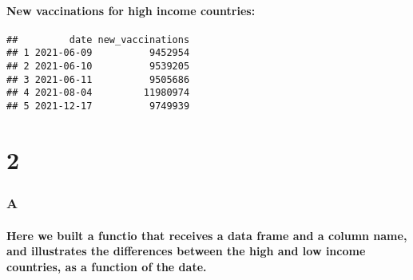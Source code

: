 \documentclass[
]{article}
\newenvironment{Shaded}{\begin{snugshade}}{\end{snugshade}}
\newcommand{\DecValTok}[1]{\textcolor[rgb]{0.00,0.00,0.81}{#1}}
\newcommand{\FunctionTok}[1]{\textcolor[rgb]{0.00,0.00,0.00}{#1}}
\newcommand{\NormalTok}[1]{#1}
\newcommand{\OtherTok}[1]{\textcolor[rgb]{0.56,0.35,0.01}{#1}}
\newcommand{\SpecialCharTok}[1]{\textcolor[rgb]{0.00,0.00,0.00}{#1}}
\newcommand{\StringTok}[1]{\textcolor[rgb]{0.31,0.60,0.02}{#1}}
\begin{document}
\begin{Shaded}
\end{Shaded}

\hypertarget{new-vaccinations-for-high-income-countries}{%
\paragraph{New vaccinations for high income
countries:}\label{new-vaccinations-for-high-income-countries}}

\begin{verbatim}
##         date new_vaccinations
## 1 2021-06-09          9452954
## 2 2021-06-10          9539205
## 3 2021-06-11          9505686
## 4 2021-08-04         11980974
## 5 2021-12-17          9749939
\end{verbatim}

\hypertarget{section-1}{%
\section{2}\label{section-1}}

\hypertarget{a-1}{%
\subsubsection{A}\label{a-1}}

\hypertarget{here-we-built-a-functio-that-receives-a-data-frame-and-a-column-name-and-illustrates-the-differences-between-the-high-and-low-income-countries-as-a-function-of-the-date.}{%
\paragraph{Here we built a functio that receives a data frame and a
column name, and illustrates the differences between the high and low
income countries, as a function of the
date.}\label{here-we-built-a-functio-that-receives-a-data-frame-and-a-column-name-and-illustrates-the-differences-between-the-high-and-low-income-countries-as-a-function-of-the-date.}}
\end{document}
